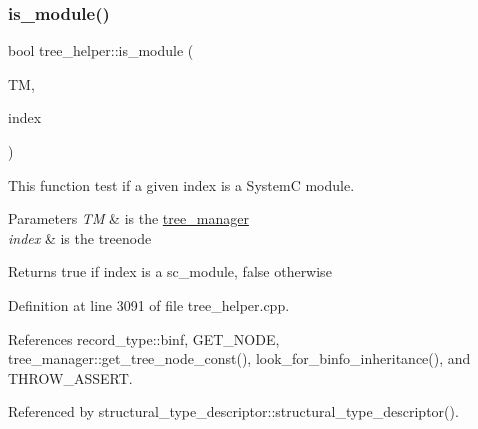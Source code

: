 \subsubsection{\texorpdfstring{is\+\_\+module()}{is\_module()}}
{\footnotesize\ttfamily bool tree\+\_\+helper\+::is\+\_\+module (\begin{DoxyParamCaption}\item[{const \hyperlink{tree__manager_8hpp_a792e3f1f892d7d997a8d8a4a12e39346}{tree\+\_\+manager\+Const\+Ref} \&}]{TM,  }\item[{unsigned int}]{index }\end{DoxyParamCaption})\hspace{0.3cm}{\ttfamily [static]}}



This function test if a given index is a SystemC module. 


\begin{DoxyParams}{Parameters}
{\em TM} & is the \hyperlink{classtree__manager}{tree\+\_\+manager} \\
\hline
{\em index} & is the treenode \\
\hline
\end{DoxyParams}
\begin{DoxyReturn}{Returns}
true if index is a sc\+\_\+module, false otherwise 
\end{DoxyReturn}


Definition at line 3091 of file tree\+\_\+helper.\+cpp.



References record\+\_\+type\+::binf, G\+E\+T\+\_\+\+N\+O\+DE, tree\+\_\+manager\+::get\+\_\+tree\+\_\+node\+\_\+const(), look\+\_\+for\+\_\+binfo\+\_\+inheritance(), and T\+H\+R\+O\+W\+\_\+\+A\+S\+S\+E\+RT.



Referenced by structural\+\_\+type\+\_\+descriptor\+::structural\+\_\+type\+\_\+descriptor().

